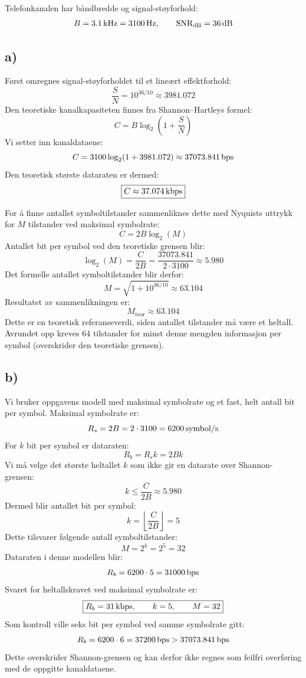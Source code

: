 Telefonkanalen har båndbredde og signal-støyforhold:
\[
    B=3.1\,\mathrm{kHz}=3100\,\mathrm{Hz},
    \qquad \mathrm{SNR}_{\mathrm{dB}}=36\,\mathrm{dB}
\]

\subsection*{a)}
Først omregnes signal-støyforholdet til et lineært effektforhold:
\[
    \frac{S}{N}=10^{36/10}\approx3981.072
\]
Den teoretiske kanalkapasiteten finnes fra Shannon--Hartleys formel:
\[
    C=B\log_2\!\left(1+\frac{S}{N}\right)
\]
Vi setter inn kanaldataene:
\[
    C=3100\log_2(1+3981.072)
      \approx37073.841\,\mathrm{bps}
\]
Den teoretisk største dataraten er dermed:
\[
    \boxed{C\approx37.074\,\mathrm{kbps}}
\]

For å finne antallet symboltilstander sammenliknes dette med Nyquists uttrykk for $M$ tilstander ved maksimal symbolrate:
\[
    C=2B\log_2(M)
\]
Antallet bit per symbol ved den teoretiske grensen blir:
\[
    \log_2(M)=\frac{C}{2B}
             =\frac{37073.841}{2\cdot3100}
             \approx5.980
\]
Det formelle antallet symboltilstander blir derfor:
\[
    M=\sqrt{1+10^{36/10}}\approx63.104
\]
Resultatet av sammenlikningen er:
\[
    \boxed{M_{\mathrm{teor}}\approx63.104}
\]
Dette er en teoretisk referanseverdi, siden antallet tilstander må være et heltall. Avrundet opp kreves 64 tilstander for minst denne mengden informasjon per symbol (overskrider den teoretiske grensen).

\newpage
\subsection*{b)}
Vi bruker oppgavens modell med maksimal symbolrate og et fast, helt antall bit per symbol. Maksimal symbolrate er:
\[
    R_s=2B=2\cdot3100=6200\,\mathrm{symbol/s}
\]
For $k$ bit per symbol er dataraten:
\[
    R_b=R_s k=2Bk
\]
Vi må velge det største heltallet $k$ som ikke gir en datarate over Shannon-grensen:
\[
    k\leq\frac{C}{2B}\approx5.980
\]
Dermed blir antallet bit per symbol:
\[
    k=\left\lfloor\frac{C}{2B}\right\rfloor=5
\]
Dette tilsvarer følgende antall symboltilstander:
\[
    M=2^k=2^5=32
\]
Dataraten i denne modellen blir:
\[
    R_b=6200\cdot5=31000\,\mathrm{bps}
\]
Svaret for heltallskravet ved maksimal symbolrate er:
\[
    \boxed{R_b=31\,\mathrm{kbps},\qquad k=5,\qquad M=32}
\]
Som kontroll ville seks bit per symbol ved samme symbolrate gitt:
\[
    R_b=6200\cdot6=37200\,\mathrm{bps}
       >37073.841\,\mathrm{bps}
\]
Dette overskrider Shannon-grensen og kan derfor ikke regnes som feilfri overføring med de oppgitte kanaldataene.
